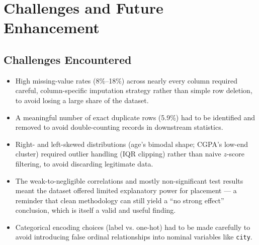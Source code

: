 \documentclass[11pt]{article}
\begin{document}
\section{Challenges and Future Enhancement}

\subsection*{Challenges Encountered}
\begin{itemize}[leftmargin=1.2cm]
    \item High missing-value rates (8\%--18\%) across nearly every column required careful, column-specific imputation strategy rather than simple row deletion, to avoid losing a large share of the dataset.
    \item A meaningful number of exact duplicate rows (5.9\%) had to be identified and removed to avoid double-counting records in downstream statistics.
    \item Right- and left-skewed distributions (age's bimodal shape; CGPA's low-end cluster) required outlier handling (IQR clipping) rather than naive $z$-score filtering, to avoid discarding legitimate data.
    \item The weak-to-negligible correlations and mostly non-significant test results meant the dataset offered limited explanatory power for placement --- a reminder that clean methodology can still yield a ``no strong effect'' conclusion, which is itself a valid and useful finding.
    \item Categorical encoding choices (label vs. one-hot) had to be made carefully to avoid introducing false ordinal relationships into nominal variables like \texttt{city}.
\end{itemize}
\end{document}
